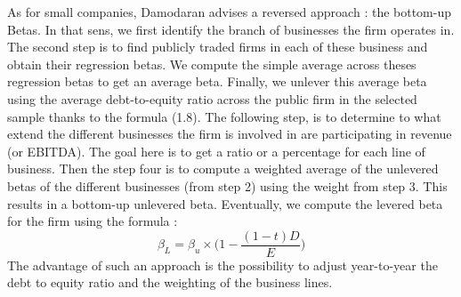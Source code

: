 As for small companies, Damodaran advises a reversed approach : the bottom-up Betas.  In that sens, we first identify the branch of businesses the firm operates in. The second step is to find publicly traded firms in each of these business and obtain their regression betas. We compute the simple average across theses regression betas to get an average beta. Finally, we unlever this average beta using the average debt-to-equity ratio across the public firm in the selected sample thanks to the formula (1.8). The following step, is to determine to what extend the different businesses the firm is involved in are participating in revenue (or EBITDA). The goal here is to get a ratio or a percentage for each line of business. Then the step four is to compute a weighted average of the unlevered betas of the different businesses (from step 2) using the weight from step 3. This results in a bottom-up unlevered beta. Eventually, we compute the levered beta for the firm using the formula : 
\begin{equation}
    \beta_L =  \beta_u \times \bigg( 1 - \frac{(1-t)D}{E}\bigg)
\end{equation}
 The advantage of such an approach is the possibility to adjust year-to-year the debt to equity ratio and the weighting of the business lines. 
 
